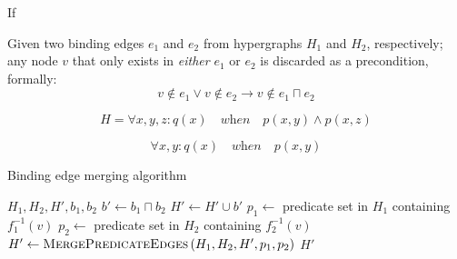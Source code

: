 \documentclass[../Master.tex]{subfiles}
\providecommand{\master}{..}
\begin{document}
\begin{proposition}
    If
\end{proposition}

\begin{proposition}
    Given two binding edges $e_1$ and $e_2$ from hypergraphs $H_1$ and $H_2$, respectively; any node $v$ that only exists in \emph{either} $e_1$ or $e_2$ is discarded as a precondition, formally:
    \begin{equation*}
        v \notin e_1 \lor v \notin e_2 \rightarrow v \notin e_1 \sqcap e_2
    \end{equation*}
\end{proposition}

\begin{example}
    \begin{equation*}
        H = \forall x, y, z : q(x) \quad \textit{when} \quad
            p(x,y) \land p(x,z)
    \end{equation*}

    \begin{equation}
        \forall x, y : q(x) \quad \textit{when} \quad p(x,y)
    \end{equation}

    \begin{figure}
        \centering
        \hfill
        \begin{subfigure}[b]{0.4\textwidth}
            \centering
            \resizebox{0.7\linewidth}{!}{}
            \caption{}
            \label{fig:ex:ca:hgma:ex:isomorphic}
        \end{subfigure}%
        \hfill%
        \begin{subfigure}[b]{0.4\textwidth}
            \centering
            \resizebox{0.75\linewidth}{!}{}
            \caption{}
            \label{fig:ex:ca:hgma:ex:isomorphic_reduced}
        \end{subfigure}
        \hfill
    \end{figure}
\end{example}

\begin{algorithm}
    \caption{Binding edge merging algorithm}
    \label{algo:bindingedgemerge}
    \begin{algorithmic}
         {$H_1, H_2, H', b_1, b_2$}
            \State $b' \gets b_1 \sqcap b_2$
            \State $H' \gets H' \cup b'$
                    \State $p_1 \gets$ predicate set in $H_1$ containing $f_1^{-1}(v)$
                    \State $p_2 \gets$ predicate set in $H_2$ containing $f_2^{-1}(v)$
                    \State $H' \gets \textsc{MergePredicateEdges}
                                        \left( H_1, H_2, H', p_1, p_2 \right)$
                \EndIf
            \EndFor
            \State \Return $H'$
        \EndFunction
    \end{algorithmic}
\end{algorithm}
\end{document}
